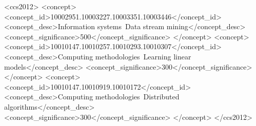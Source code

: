 \documentclass[sigconf]{acmart}
\begin{document}
%
%
\begin{CCSXML}
<ccs2012>
<concept>
<concept_id>10002951.10003227.10003351.10003446</concept_id>
<concept_desc>Information systems~Data stream mining</concept_desc>
<concept_significance>500</concept_significance>
</concept>
<concept>
<concept_id>10010147.10010257.10010293.10010307</concept_id>
<concept_desc>Computing methodologies~Learning linear models</concept_desc>
<concept_significance>300</concept_significance>
</concept>
<concept>
<concept_id>10010147.10010919.10010172</concept_id>
<concept_desc>Computing methodologies~Distributed algorithms</concept_desc>
<concept_significance>300</concept_significance>
</concept>
</ccs2012>
\end{CCSXML}



%
%




\maketitle


\end{document}
